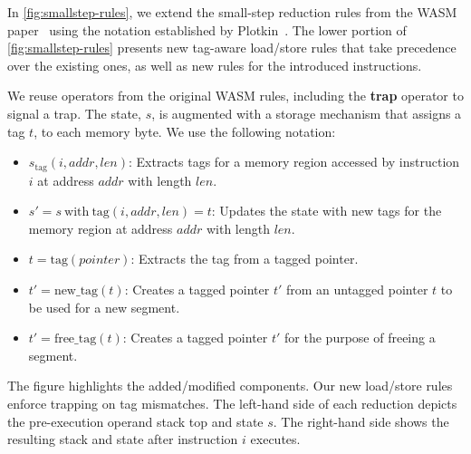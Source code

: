 In \cref{fig:smallstep-rules}, we extend the small-step reduction rules from the WASM paper~\cite{haas2017bringing} using the notation established by Plotkin~\cite{plotkin1981structural}.
The lower portion of  \cref{fig:smallstep-rules} presents new tag-aware load/store rules that take precedence over the existing ones, as well as new rules for the introduced instructions.

We reuse operators from the original WASM rules, including the \textbf{trap} operator to signal a trap.
The state, $s$, is augmented with a storage mechanism that assigns a tag $t$, to each memory byte.
We use the following notation:

\begin{itemize}
    \item $s_{\text{tag}}(i, \mathit{addr}, \mathit{len})$: Extracts tags for a memory region accessed by instruction $i$ at address $\mathit{addr}$ with length $\mathit{len}$.
    \item $s' = s\ \text{with}\ \text{tag}(i, \mathit{addr}, \mathit{len}) = t$: Updates the state with new tags for the memory region at address $\mathit{addr}$ with length $\mathit{len}$.
    \item $t = \text{tag}(\mathit{pointer})$: Extracts the tag from a tagged pointer.
    \item $t' = \text{new\_tag}(t)$: Creates a tagged pointer $t'$ from an untagged pointer $t$ to be used for a new segment.
    \item $t' = \text{free\_tag}(t)$: Creates a tagged pointer $t'$ for the purpose of freeing a segment.
\end{itemize}

The figure highlights the added/modified components.
Our new load/store rules enforce trapping on tag mismatches.
The left-hand side of each reduction depicts the pre-execution operand stack top and state $s$.
The right-hand side shows the resulting stack and state after instruction $i$ executes.

